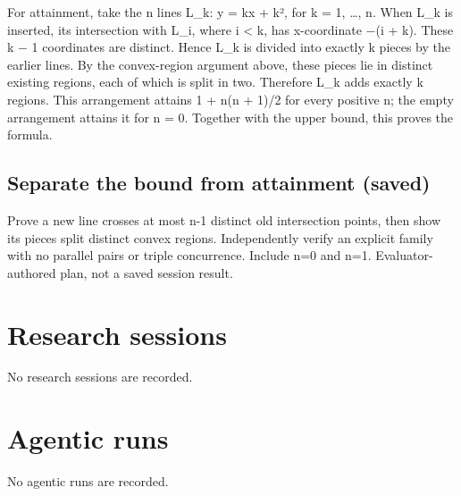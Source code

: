 \documentclass[11pt]{article}
\begin{document}
For attainment, take the n lines L\_k: y = kx + k², for k = 1, …, n. When L\_k is inserted, its intersection with L\_i, where i \textless{} k, has x-coordinate −(i + k). These k − 1 coordinates are distinct. Hence L\_k is divided into exactly k pieces by the earlier lines. By the convex-region argument above, these pieces lie in distinct existing regions, each of which is split in two. Therefore L\_k adds exactly k regions. This arrangement attains 1 + n(n + 1)/2 for every positive n; the empty arrangement attains it for n = 0. Together with the upper bound, this proves the formula.\par
\subsection{Separate the bound from attainment (saved)}
Prove a new line crosses at most n-1 distinct old intersection points, then show its pieces split distinct convex regions. Independently verify an explicit family with no parallel pairs or triple concurrence. Include n=0 and n=1. Evaluator-authored plan, not a saved session result.\par
\section{Research sessions}
No research sessions are recorded.\par
\section{Agentic runs}
No agentic runs are recorded.\par
\end{document}
